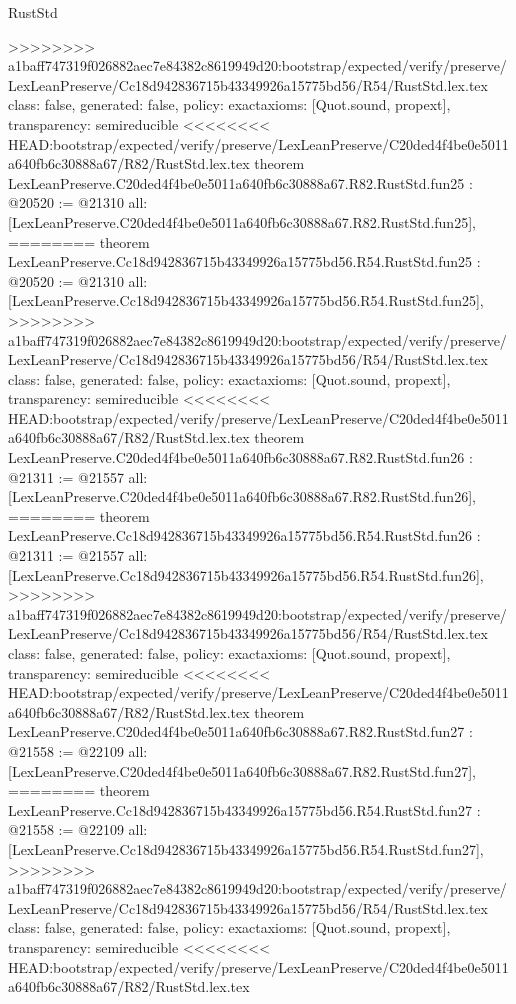 \begin{lexlean}{RustStd}
\begin{coremodule}
{\begin{coremodule}
{{{{{{{{{{{{{{{{{{{{{{{{{{{{>>>>>>>> a1baff747319f026882aec7e84382c8619949d20:bootstrap/expected/verify/preserve/LexLeanPreserve/Cc18d942836715b43349926a15775bd56/R54/RustStd.lex.tex
  class: false,
  generated: false,
  policy: exact{axioms: [Quot.sound, propext]},
  transparency: semireducible
}
<<<<<<<< HEAD:bootstrap/expected/verify/preserve/LexLeanPreserve/C20ded4f4be0e5011a640fb6c30888a67/R82/RustStd.lex.tex
theorem LexLeanPreserve.C20ded4f4be0e5011a640fb6c30888a67.R82.RustStd.fun25 : @20520 := @21310 {
  all: [LexLeanPreserve.C20ded4f4be0e5011a640fb6c30888a67.R82.RustStd.fun25],
========
theorem LexLeanPreserve.Cc18d942836715b43349926a15775bd56.R54.RustStd.fun25 : @20520 := @21310 {
  all: [LexLeanPreserve.Cc18d942836715b43349926a15775bd56.R54.RustStd.fun25],
>>>>>>>> a1baff747319f026882aec7e84382c8619949d20:bootstrap/expected/verify/preserve/LexLeanPreserve/Cc18d942836715b43349926a15775bd56/R54/RustStd.lex.tex
  class: false,
  generated: false,
  policy: exact{axioms: [Quot.sound, propext]},
  transparency: semireducible
}
<<<<<<<< HEAD:bootstrap/expected/verify/preserve/LexLeanPreserve/C20ded4f4be0e5011a640fb6c30888a67/R82/RustStd.lex.tex
theorem LexLeanPreserve.C20ded4f4be0e5011a640fb6c30888a67.R82.RustStd.fun26 : @21311 := @21557 {
  all: [LexLeanPreserve.C20ded4f4be0e5011a640fb6c30888a67.R82.RustStd.fun26],
========
theorem LexLeanPreserve.Cc18d942836715b43349926a15775bd56.R54.RustStd.fun26 : @21311 := @21557 {
  all: [LexLeanPreserve.Cc18d942836715b43349926a15775bd56.R54.RustStd.fun26],
>>>>>>>> a1baff747319f026882aec7e84382c8619949d20:bootstrap/expected/verify/preserve/LexLeanPreserve/Cc18d942836715b43349926a15775bd56/R54/RustStd.lex.tex
  class: false,
  generated: false,
  policy: exact{axioms: [Quot.sound, propext]},
  transparency: semireducible
}
<<<<<<<< HEAD:bootstrap/expected/verify/preserve/LexLeanPreserve/C20ded4f4be0e5011a640fb6c30888a67/R82/RustStd.lex.tex
theorem LexLeanPreserve.C20ded4f4be0e5011a640fb6c30888a67.R82.RustStd.fun27 : @21558 := @22109 {
  all: [LexLeanPreserve.C20ded4f4be0e5011a640fb6c30888a67.R82.RustStd.fun27],
========
theorem LexLeanPreserve.Cc18d942836715b43349926a15775bd56.R54.RustStd.fun27 : @21558 := @22109 {
  all: [LexLeanPreserve.Cc18d942836715b43349926a15775bd56.R54.RustStd.fun27],
>>>>>>>> a1baff747319f026882aec7e84382c8619949d20:bootstrap/expected/verify/preserve/LexLeanPreserve/Cc18d942836715b43349926a15775bd56/R54/RustStd.lex.tex
  class: false,
  generated: false,
  policy: exact{axioms: [Quot.sound, propext]},
  transparency: semireducible
}
<<<<<<<< HEAD:bootstrap/expected/verify/preserve/LexLeanPreserve/C20ded4f4be0e5011a640fb6c30888a67/R82/RustStd.lex.tex
}}}}}}}}}}}}}}}}}}}}}}}}}}}}}}
\end{coremodule}}
\end{coremodule}
\end{lexlean}
